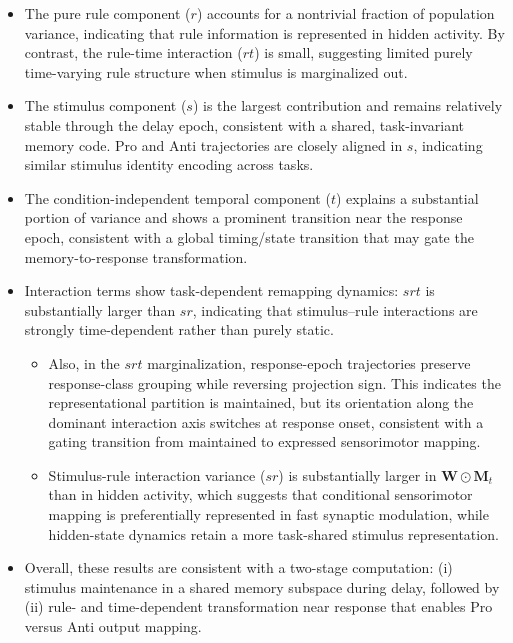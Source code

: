 \documentclass{article}
\begin{document}
\begin{itemize}
    \item The pure rule component ($r$) accounts for a nontrivial fraction of population variance, indicating that rule information is represented in hidden activity. By contrast, the rule-time interaction ($rt$) is small, suggesting limited purely time-varying rule structure when stimulus is marginalized out.
    \item The stimulus component ($s$) is the largest contribution and remains relatively stable through the delay epoch, consistent with a shared, task-invariant memory code. Pro and Anti trajectories are closely aligned in $s$, indicating similar stimulus identity encoding across tasks.
    \item The condition-independent temporal component ($t$) explains a substantial portion of variance and shows a prominent transition near the response epoch, consistent with a global timing/state transition that may gate the memory-to-response transformation.
    \item Interaction terms show task-dependent remapping dynamics: $srt$ is substantially larger than $sr$, indicating that stimulus--rule interactions are strongly time-dependent rather than purely static.
    \begin{itemize}
        \item Also, in the $srt$ marginalization, response-epoch trajectories preserve response-class grouping while reversing projection sign. This indicates the representational partition is maintained, but its orientation along the dominant interaction axis switches at response onset, consistent with a gating transition from maintained to expressed sensorimotor mapping.
        \item Stimulus-rule interaction variance ($sr$) is substantially larger in $\mathbf{W} \odot \mathbf{M}_t$ than in hidden activity, which suggests that conditional sensorimotor mapping is preferentially represented in fast synaptic modulation, while hidden-state dynamics retain a more task-shared stimulus representation.
    \end{itemize}
    \item Overall, these results are consistent with a two-stage computation: (i) stimulus maintenance in a shared memory subspace during delay, followed by (ii) rule- and time-dependent transformation near response that enables Pro versus Anti output mapping.
\end{itemize}
\end{document}
